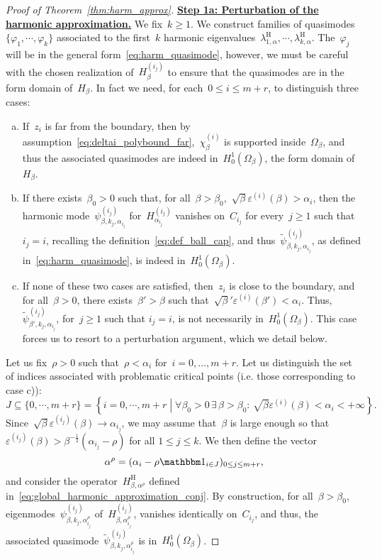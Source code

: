 \documentclass[10pt]{article}
\newcommand{\1}{\mathbbm 1}
\newcommand{\shift}{\rho} %
\begin{document}
\begin{proof}[Proof of Theorem~\ref{thm:harm_approx}]
        {\underline{\bf Step 1a: Perturbation of the harmonic approximation.}\newline}
        We fix~$k\geq 1$. We construct families of quasimodes~$\{\varphi_1,\dotsm,\varphi_k\}$ associated to the first~$k$ harmonic eigenvalues~$\lambda_{1,\alpha}^{\mathrm H},\dotsm,\lambda_{k,\alpha}^{\mathrm H}$.
        The~$\varphi_{j}$ will be in the general form~\eqref{eq:harm_quasimode}, however, we must be careful with the chosen realization of~$H_\beta^{(i_j)}$ to ensure that the quasimodes are in the form domain of~$H_\beta$.
        In fact we need, for each~$0\leq i\leq m+r$, to distinguish three cases:
        \begin{enumerate}[a)]
            \item{If~$z_i$ is far from the boundary, then by assumption~\eqref{eq:deltai_polybound_far},~$\chi_\beta^{(i)}$ is supported inside~$\Omega_\beta$, and thus the associated quasimodes are indeed in~$H_0^1(\Omega_\beta)$, the form domain of~$H_\beta$.}
            \item{If there exists~$\beta_0>0$ such that, for all~$\beta>\beta_0$,~$\sqrt\beta\varepsilon^{(i)}(\beta)>\alpha_{i}$, then the harmonic mode~$\psi^{(i_j)}_{\beta,k_j,\alpha_{i_j}}$ for~$H_{\alpha_{i_j}}^{(i_j)}$ vanishes on~$C_{i_j}$ for every~$j\geq 1$ such that~$i_j=i$, recalling the definition~\eqref{eq:def_ball_cap}, and thus~$\widetilde\psi^{(i_j)}_{\beta,k_j,\alpha_{i_j}}$, as defined in~\eqref{eq:harm_quasimode}, is indeed in~$H_0^1(\Omega_\beta)$.}
            \item{If none of these two cases are satisfied, then~$z_{i}$ is close to the boundary, and for all~$\beta>0$, there exists~$\beta'>\beta$ such that~$\sqrt\beta'\varepsilon^{(i)}(\beta')<\alpha_{i}$. Thus,~$\widetilde \psi^{(i_j)}_{\beta',k_j,\alpha_{i_j}}$, for~$j\geq 1$ such that $i_j=i$, is not necessarily in~$H_0^1(\Omega_\beta)$. This case forces us to resort to a perturbation argument, which we detail below.}
        \end{enumerate}

        Let us fix~$\shift>0$ such that~$\shift<\alpha_i$ for~$i=0,\dots,m+r$.
        Let us distinguish the set of indices associated with problematic critical points (i.e. those corresponding to case c)):
       ~$$J \subseteq \{0,\dotsm,m+r\} = \left\{i = 0,\dotsm,m+r\middle| \forall \beta_0>0\,\exists\, \beta>\beta_0:\,\sqrt\beta\varepsilon^{(i)}(\beta) < \alpha_i < +\infty\right\}.$$
        Since~$\sqrt\beta\varepsilon^{(i_j)}(\beta)\to \alpha_{i_j}$, we may assume that~$\beta$ is large enough so that~$\varepsilon^{(i_j)}(\beta) > \beta^{-\frac12}\left(\alpha_{i_j}-\shift\right)$ for all $1\leq j\leq k$.
        We then define the vector
        \[\alpha^\shift = (\alpha_i - \shift\1_{i\in J})_{0\leq j\leq m+r},\]
        and consider the operator~$H_{\beta,\alpha^\shift}^{\mathrm H}$ defined in~\eqref{eq:global_harmonic_approximation_conj}.
        By construction, for all~$\beta>\beta_0$, eigenmodes~$\psi_{\beta,k_j,\alpha^\shift_{i_j}}^{(i_j)}$ of~$H_{\beta,\alpha^\shift_{i_j}}^{(i_j)}$, vanishes identically on~$C_{i_j}$, and thus, the associated quasimode~$\widetilde\psi_{\beta,k_j,\alpha^\shift_{i_j}}^{(i_j)}$ is in~$H_0^1(\Omega_\beta)$.
        

\end{proof}
\end{document}
